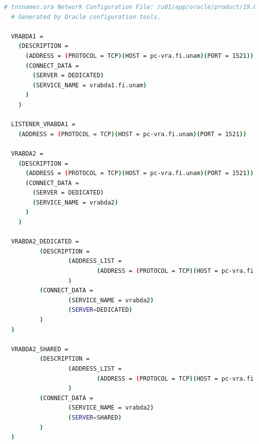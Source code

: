 \documentclass[journal]{IEEEtran}
\begin{document}
\begin{lstlisting}[language=bash, caption=tnsname.ora,label={lst:codigo2}]
  # tnsnames.ora Network Configuration File: /u01/app/oracle/product/19.0.0/dbhome_1/network/admin/tnsnames.ora
  # Generated by Oracle configuration tools.
  
  VRABDA1 =
    (DESCRIPTION =
      (ADDRESS = (PROTOCOL = TCP)(HOST = pc-vra.fi.unam)(PORT = 1521))
      (CONNECT_DATA =
        (SERVER = DEDICATED)
        (SERVICE_NAME = vrabda1.fi.unam)
      )
    )
  
  LISTENER_VRABDA1 =
    (ADDRESS = (PROTOCOL = TCP)(HOST = pc-vra.fi.unam)(PORT = 1521))
  
  VRABDA2 =
    (DESCRIPTION =
      (ADDRESS = (PROTOCOL = TCP)(HOST = pc-vra.fi.unam)(PORT = 1521))
      (CONNECT_DATA =
        (SERVER = DEDICATED)
        (SERVICE_NAME = vrabda2)
      )
    )
  
  VRABDA2_DEDICATED =
          (DESCRIPTION =
                  (ADDRESS_LIST =
                          (ADDRESS = (PROTOCOL = TCP)(HOST = pc-vra.fi.unam)(PORT = 1521))
                  )
          (CONNECT_DATA =
                  (SERVICE_NAME = vrabda2)
                  (SERVER=DEDICATED)
          )
  )
  
  VRABDA2_SHARED =
          (DESCRIPTION =
                  (ADDRESS_LIST =
                          (ADDRESS = (PROTOCOL = TCP)(HOST = pc-vra.fi.unam)(PORT = 1521))
                  )
          (CONNECT_DATA =
                  (SERVICE_NAME = vrabda2)
                  (SERVER=SHARED)
          )
  )
\end{lstlisting}
\end{document}
